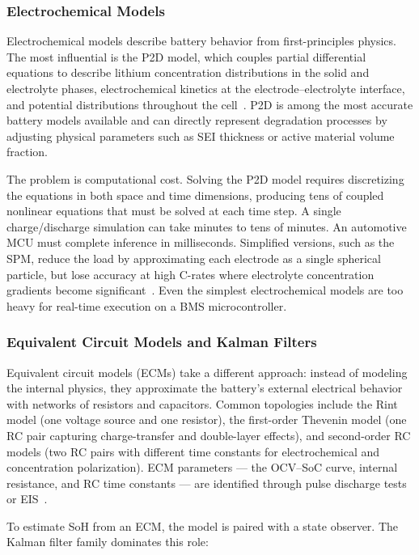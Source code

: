 \subsubsection*{Electrochemical Models}

Electrochemical models describe battery behavior from first-principles physics. The most influential is the \gls{P2D} model, which couples partial differential equations to describe lithium concentration distributions in the solid and electrolyte phases, electrochemical kinetics at the electrode--electrolyte interface, and potential distributions throughout the cell~\autocite{doyle1993}. P2D is among the most accurate battery models available and can directly represent degradation processes by adjusting physical parameters such as SEI thickness or active material volume fraction.

The problem is computational cost. Solving the P2D model requires discretizing the equations in both space and time dimensions, producing tens of coupled nonlinear equations that must be solved at each time step. A single charge/discharge simulation can take minutes to tens of minutes. An automotive MCU must complete inference in milliseconds. Simplified versions, such as the \gls{SPM}, reduce the load by approximating each electrode as a single spherical particle, but lose accuracy at high C-rates where electrolyte concentration gradients become significant~\autocite{santhanagopalan2006}. Even the simplest electrochemical models are too heavy for real-time execution on a BMS microcontroller.

\subsubsection*{Equivalent Circuit Models and Kalman Filters}

Equivalent circuit models (ECMs) take a different approach: instead of modeling the internal physics, they approximate the battery's external electrical behavior with networks of resistors and capacitors. Common topologies include the Rint model (one voltage source and one resistor), the first-order Thevenin model (one RC pair capturing charge-transfer and double-layer effects), and second-order RC models (two RC pairs with different time constants for electrochemical and concentration polarization). ECM parameters --- the OCV--SoC curve, internal resistance, and RC time constants --- are identified through pulse discharge tests or \gls{EIS}~\autocite{ECM_EKF}.

To estimate SoH from an ECM, the model is paired with a state observer. The Kalman filter family dominates this role:

